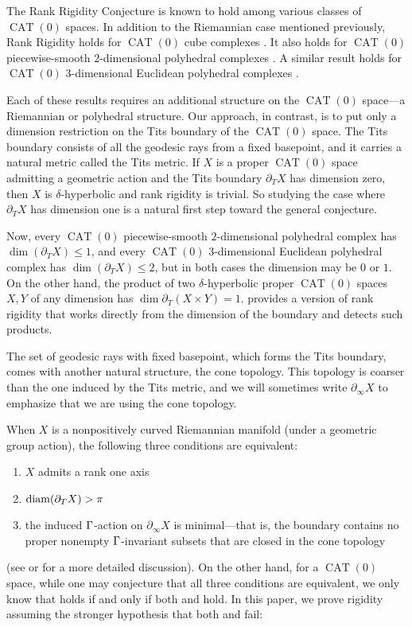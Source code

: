 \documentclass{amsart}
\newcommand{\bdT}{\partial_T}
\newcommand{\bdc}{\partial_{\infty}}
\DeclareMathOperator{\CAT}{CAT}
\begin{document}
The Rank Rigidity Conjecture is known to hold among various classes of $\CAT(0)$ spaces.
In addition to the Riemannian case mentioned previously, Rank Rigidity holds for $\CAT(0)$ cube complexes \cite{caprace-sageev}.
It also holds for $\CAT(0)$ piecewise-smooth $2$-dimensional polyhedral complexes \cite{bbrin-2dim}.
A similar result holds for $\CAT(0)$ $3$-dimensional Euclidean polyhedral complexes \cite{bbrin-3dim}.

Each of these results requires an additional structure on the $\CAT(0)$ space---a Riemannian or polyhedral structure.
Our approach, in contrast, is to put only a dimension restriction on the Tits boundary of the $\CAT(0)$ space.
The Tits boundary consists of all the geodesic rays from a fixed basepoint, and it carries a natural metric called the Tits metric.
If $X$ is a proper $\CAT(0)$ space admitting a geometric action and the Tits boundary $\bdT X$ has dimension zero, then $X$ is $\delta$-hyperbolic and rank rigidity is trivial.
So studying the case where $\bdT X$ has dimension one is a natural first step toward the general conjecture.

Now, every $\CAT(0)$ piecewise-smooth $2$-dimensional polyhedral complex has $\dim(\bdT X) \le 1$, and every $\CAT(0)$ $3$-dimensional Euclidean polyhedral complex has $\dim(\bdT X) \le 2$, but in both cases the dimension may be $0$ or $1$.
On the other hand, the product of two $\delta$-hyperbolic proper $\CAT(0)$ spaces $X,Y$ of any dimension has $\dim \bdT (X \times Y) = 1$.
 provides a version of rank rigidity that works directly from the dimension of the boundary and detects such products.

The set of geodesic rays with fixed basepoint, which forms the Tits boundary, comes with another natural structure, the cone topology.
This topology is coarser than the one induced by the Tits metric, and we will sometimes write $\bdc X$ to emphasize that we are using the cone topology.

When $X$ is a nonpositively curved Riemannian manifold (under a geometric group action),
the following three conditions are equivalent:
\begin{enumerate}
\item  \label{ro1}
$X$ admits a rank one axis
\item  \label{ro2}
$\diam (\bdT X) > \pi$
\item  \label{ro3}
the induced $\Gamma$-action on $\bdc X$ is minimal---that is, the boundary contains no proper nonempty $\Gamma$-invariant subsets that are closed in the cone topology%
\end{enumerate}
(see \cite{ballmann} or \cite{ricks-mixing} for a more detailed discussion).
On the other hand, for a $\CAT(0)$ space, while one may conjecture that all three conditions are equivalent, we only know that
 holds if and only if both  and  hold.
In this paper, we prove rigidity assuming the stronger hypothesis that both  and  fail:
\end{document}
